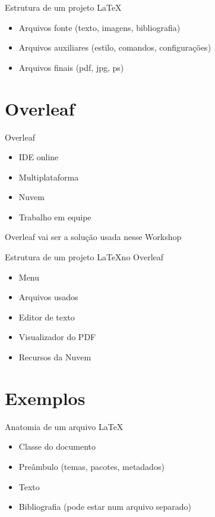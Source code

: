 \documentclass[aspectratio=169,xcolor=dvipsnames]{beamer}
\begin{document}
\begin{frame}{Estrutura de um projeto \LaTeX }
    \begin{itemize}
        \item Arquivos fonte (texto, imagens, bibliografia)
        \item Arquivos auxiliares (estilo, comandos, configurações)
        \item Arquivos finais (pdf, jpg, ps)
    \end{itemize}
\end{frame}

\section{Overleaf}

\begin{frame}{Overleaf}
    \begin{itemize}
        \item IDE online
        \item Multiplataforma
        \item Nuvem
        \item Trabalho em equipe
    \end{itemize}
    Overleaf vai ser a solução usada nesse Workshop
\end{frame}



\begin{frame}{Estrutura de um projeto \LaTeX no Overleaf }
     \begin{itemize}
        \item Menu
        \item Arquivos usados
        \item Editor de texto
        \item Visualizador do PDF
        \item Recursos da Nuvem
    \end{itemize}
\end{frame}

\section{Exemplos}

\begin{frame}{Anatomia de um arquivo \LaTeX}
    \begin{itemize}
        \item Classe do documento 
        \item Preâmbulo (temas, pacotes, metadados)
        \item Texto
        \item Bibliografia (pode estar num arquivo separado)
    \end{itemize}
\end{frame}
\end{document}
